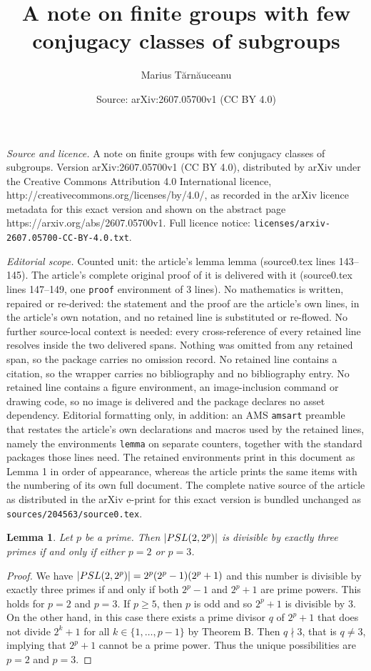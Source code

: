 \documentclass[10pt,a4paper]{amsart}
\title{A note on finite groups with few conjugacy classes of subgroups}
\author{Marius T\u{a}rn\u{a}uceanu}
\date{Source: arXiv:2607.05700v1 (CC BY 4.0)}
\newtheorem{lemma}{Lemma}
\begin{document}
\maketitle

\noindent\emph{Source and licence.} A note on finite groups with few conjugacy classes of subgroups. Version arXiv:2607.05700v1 (CC BY 4.0), distributed by arXiv under the Creative Commons Attribution 4.0 International licence, http://creativecommons.org/licenses/by/4.0/, as recorded in the arXiv licence metadata for this exact version and shown on the abstract page https://arxiv.org/abs/2607.05700v1. Full licence notice: \texttt{licenses/arxiv-2607.05700-CC-BY-4.0.txt}.\par\smallskip

\noindent\textit{Editorial scope.} Counted unit: the article's lemma lemma (source0.tex lines 143--145). The article's complete original proof of it is delivered with it (source0.tex lines 147--149, one \texttt{proof} environment of 3 lines). No mathematics is written, repaired or re-derived: the statement and the proof are the article's own lines, in the article's own notation, and no retained line is substituted or re-flowed.  No further source-local context is needed: every cross-reference of every retained line resolves inside the two delivered spans.  Nothing was omitted from any retained span, so the package carries no omission record.  No retained line contains a citation, so the wrapper carries no bibliography and no bibliography entry.  No retained line contains a figure environment, an image-inclusion command or drawing code, so no image is delivered and the package declares no asset dependency.  Editorial formatting only, in addition: an AMS \texttt{amsart} preamble that restates the article's own declarations and macros used by the retained lines, namely the environments \texttt{lemma} on separate counters, together with the standard packages those lines need.  The retained environments print in this document as Lemma 1 in order of appearance, whereas the article prints the same items with the numbering of its own full document.  The complete native source of the article as distributed in the arXiv e-print for this exact version is bundled unchanged as \texttt{sources/204563/source0.tex}.
\begin{lemma}
Let $p$ be a prime. Then $|{\rm PSL}(2,2^p)|$ is divisible by exactly three primes if and only if either $p=2$ or $p=3$.
\end{lemma}

\begin{proof}
We have $|{\rm PSL}(2,2^p)|=2^p(2^p-1)(2^p+1)$ and this number is divisible by exactly three primes if and only if both $2^p-1$ and $2^p+1$ are prime powers. This holds for $p=2$ and $p=3$. If $p\geq 5$, then $p$ is odd and so $2^p+1$ is divisible by $3$. On the other hand, in this case there exists a prime divisor $q$ of $2^p+1$ that does not divide $2^k+1$ for all $k\in\{1, \dots, p-1\}$ by Theorem B. Then $q\nmid 3$, that is $q\neq 3$, implying that $2^p+1$ cannot be a prime power. Thus the unique possibilities are $p=2$ and $p=3$.\qedhere
\end{proof}
\end{document}
